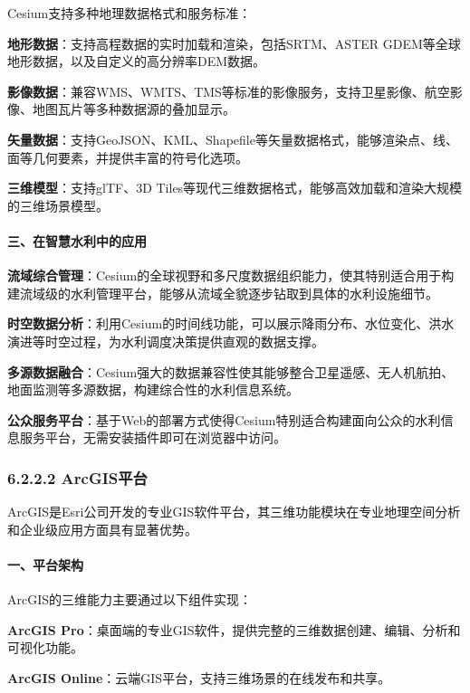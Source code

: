 Cesium支持多种地理数据格式和服务标准：

\textbf{地形数据}：支持高程数据的实时加载和渲染，包括SRTM、ASTER
GDEM等全球地形数据，以及自定义的高分辨率DEM数据。

\textbf{影像数据}：兼容WMS、WMTS、TMS等标准的影像服务，支持卫星影像、航空影像、地图瓦片等多种数据源的叠加显示。

\textbf{矢量数据}：支持GeoJSON、KML、Shapefile等矢量数据格式，能够渲染点、线、面等几何要素，并提供丰富的符号化选项。

\textbf{三维模型}：支持glTF、3D
Tiles等现代三维数据格式，能够高效加载和渲染大规模的三维场景模型。

\paragraph{三、在智慧水利中的应用}\label{ux4e09ux5728ux667aux6167ux6c34ux5229ux4e2dux7684ux5e94ux7528-1}

\textbf{流域综合管理}：Cesium的全球视野和多尺度数据组织能力，使其特别适合用于构建流域级的水利管理平台，能够从流域全貌逐步钻取到具体的水利设施细节。

\textbf{时空数据分析}：利用Cesium的时间线功能，可以展示降雨分布、水位变化、洪水演进等时空过程，为水利调度决策提供直观的数据支撑。

\textbf{多源数据融合}：Cesium强大的数据兼容性使其能够整合卫星遥感、无人机航拍、地面监测等多源数据，构建综合性的水利信息系统。

\textbf{公众服务平台}：基于Web的部署方式使得Cesium特别适合构建面向公众的水利信息服务平台，无需安装插件即可在浏览器中访问。

\subsubsection{6.2.2.2 ArcGIS平台}\label{arcgisux5e73ux53f0}

ArcGIS是Esri公司开发的专业GIS软件平台，其三维功能模块在专业地理空间分析和企业级应用方面具有显著优势。

\paragraph{一、平台架构}\label{ux4e00ux5e73ux53f0ux67b6ux6784}

ArcGIS的三维能力主要通过以下组件实现：

\textbf{ArcGIS
Pro}：桌面端的专业GIS软件，提供完整的三维数据创建、编辑、分析和可视化功能。

\textbf{ArcGIS Online}：云端GIS平台，支持三维场景的在线发布和共享。

